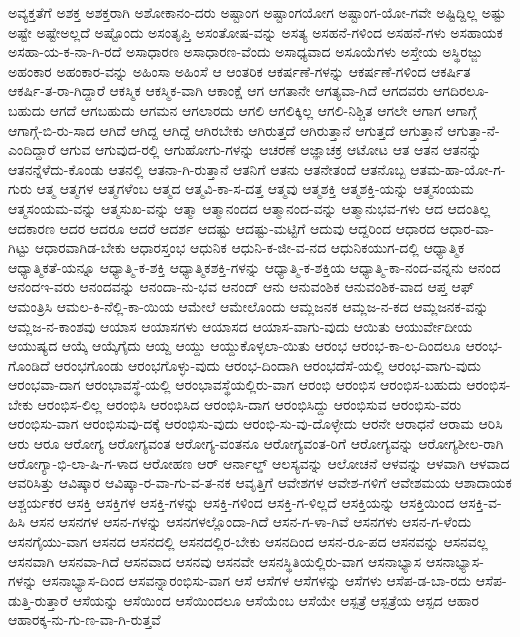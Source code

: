 {ಅವ್ಯಕ್ತತೆಗೆ
ಅಶಕ್ತ
ಅಶಕ್ತರಾಗಿ
ಅಶೋಕಾನಂ-ದರು
ಅಷ್ಟಾಂಗ
ಅಷ್ಟಾಂಗಯೋಗ
ಅಷ್ಟಾಂಗ-ಯೋ-ಗವೇ
ಅಷ್ಟಿದ್ದಿಲ್ಲ
ಅಷ್ಟು
ಅಷ್ಟೇ
ಅಷ್ಟೇಅಲ್ಲದೆ
ಅಷ್ಟೊಂದು
ಅಸಂತೃಪ್ತಿ
ಅಸಂತೋಷ-ವನ್ನು
ಅಸತ್ಯ
ಅಸಹನೆ-ಗಳಿಂದ
ಅಸಹನೆ-ಗಳು
ಅಸಹಾಯಕ
ಅಸಹಾ-ಯ-ಕ-ನಾ-ಗಿ-ರದೆ
ಅಸಾಧಾರಣ
ಅಸಾಧಾರಣ-ವೆಂದು
ಅಸಾಧ್ಯವಾದ
ಅಸೂಯೆಗಳು
ಅಸ್ತೇಯ
ಅಸ್ಥಿರಜ್ಜು
ಅಹಂಕಾರ
ಅಹಂಕಾರ-ವನ್ನು
ಅಹಿಂಸಾ
ಅಹಿಂಸೆ
ಆ
ಆಂತರಿಕ
ಆಕರ್ಷಣೆ-ಗಳನ್ನು
ಆಕರ್ಷಣೆ-ಗಳಿಂದ
ಆಕರ್ಷಿತ
ಆಕರ್ಷಿ-ತ-ರಾ-ಗಿದ್ದಾರೆ
ಆಕಸ್ಮಿಕ
ಆಕಸ್ಮಿಕ-ವಾಗಿ
ಆಕಾಂಕ್ಷೆ
ಆಗ
ಆಗತಾನೇ
ಆಗತ್ಯವಾ-ಗಿದೆ
ಆಗದವರು
ಆಗದಿರಲೂ-ಬಹುದು
ಆಗದೆ
ಆಗಬಹುದು
ಆಗಮನ
ಆಗಲಾರದು
ಆಗಲಿ
ಆಗಲಿಕ್ಕಿಲ್ಲ
ಆಗಲಿ-ನಿಶ್ಚಿತ
ಆಗಲೇ
ಆಗಾಗ
ಆಗಾಗ್ಗೆ
ಆಗಾಗ್ಗೆ-ಬಿ-ರು-ಸಾದ
ಆಗಿದೆ
ಆಗಿದ್ದ
ಆಗಿದ್ದೆ
ಆಗಿರಬೇಕು
ಆಗಿರುತ್ತದೆ
ಆಗಿರುತ್ತಾನೆ
ಆಗುತ್ತದೆ
ಆಗುತ್ತಾನೆ
ಆಗುತ್ತಾ-ನೆ-ಎಂದಿದ್ದಾರೆ
ಆಗುವ
ಆಗುವುದ-ರಲ್ಲಿ
ಆಗುಹೋಗು-ಗಳನ್ನು
ಆಚರಣೆ
ಆಜ್ಞಾಚಕ್ರ
ಆಟೋಟ
ಆತ
ಆತನ
ಆತನನ್ನು
ಆತನನ್ನೆಳೆದು-ಕೊಂಡು
ಆತನಲ್ಲಿ
ಆತನಾ-ಗಿ-ರುತ್ತಾನೆ
ಆತನಿಗೆ
ಆತನು
ಆತನೇತಂದೆ
ಆತನೊಬ್ಬ
ಆತಮ-ಹಾ-ಯೋ-ಗ-ಗುರು
ಆತ್ಮ
ಆತ್ಮಗಳ
ಆತ್ಮಗಳೆಂಬ
ಆತ್ಮದ
ಆತ್ಮವಿ-ಕಾ-ಸ-ದತ್ತ
ಆತ್ಮವು
ಆತ್ಮಶಕ್ತಿ
ಆತ್ಮಶಕ್ತಿ-ಯನ್ನು
ಆತ್ಮಸಂಯಮ
ಆತ್ಮಸಂಯಮ-ವನ್ನು
ಆತ್ಮಸುಖ-ವನ್ನು
ಆತ್ಮಾ
ಆತ್ಮಾನಂದದ
ಆತ್ಮಾನಂದ-ವನ್ನು
ಆತ್ಮಾನುಭವ-ಗಳು
ಆದ
ಆದಂತಿಲ್ಲ
ಆದಕಾರಣ
ಆದರ
ಆದರೂ
ಆದರೆ
ಆದರ್ಶ
ಆದಷ್ಟು
ಆದಷ್ಟು-ಮಟ್ಟಿಗೆ
ಆದುವು
ಆದ್ದರಿಂದ
ಆಧಾರದ
ಆಧಾರ-ವಾ-ಗಿಟ್ಟು
ಆಧಾರವಾಗಿಡ-ಬೇಕು
ಆಧಾರಸ್ತಂಭ
ಆಧುನಿಕ
ಆಧುನಿ-ಕ-ಜೀ-ವ-ನದ
ಆಧುನಿಕಯುಗ-ದಲ್ಲಿ
ಆಧ್ಯಾತ್ಮಿಕ
ಆಧ್ಯಾತ್ಮಿಕತೆ-ಯನ್ನೂ
ಆಧ್ಯಾತ್ಮಿ-ಕ-ಶಕ್ತಿ
ಆಧ್ಯಾತ್ಮಿಕಶಕ್ತಿ-ಗಳನ್ನು
ಆಧ್ಯಾತ್ಮಿ-ಕ-ಶಕ್ತಿಯ
ಆಧ್ಯಾತ್ಮಿ-ಕಾ-ನಂದ-ವನ್ನನು
ಆನಂದ
ಆನಂದಇ-ವರು
ಆನಂದವನ್ನು
ಆನಂದಾ-ನು-ಭವ
ಆನಂದ್
ಆನು
ಆನುವಂಶಿಕ
ಆನುವಂಶಿಕ-ವಾದ
ಆಪ್ತ
ಆಫ್
ಆಮಂತ್ರಿಸಿ
ಆಮಲ-ಕಿ-ನೆಲ್ಲಿ-ಕಾ-ಯಿಯ
ಆಮೇಲೆ
ಆಮೇಲೊಂದು
ಆಮ್ಲಜನಕ
ಆಮ್ಲಜ-ನ-ಕದ
ಆಮ್ಲಜನಕ-ವನ್ನು
ಆಮ್ಲಜ-ನ-ಕಾಂಶವು
ಆಯಾಸ
ಆಯಾಸಗಳು
ಆಯಾಸದ
ಆಯಾಸ-ವಾಗು-ವುದು
ಆಯಿತು
ಆಯುರ್ವೇದೀಯ
ಆಯುಷ್ಯದ
ಆಯ್ಕೆ
ಆಯ್ಕೆಗೈದು
ಆಯ್ದ
ಆಯ್ದು
ಆಯ್ದುಕೊಳ್ಳಲಾ-ಯಿತು
ಆರಂಭ
ಆರಂಭ-ಕಾ-ಲ-ದಿಂದಲೂ
ಆರಂಭ-ಗೊಂಡಿದೆ
ಆರಂಭಗೊಂಡು
ಆರಂಭಗೊಳ್ಳು-ವುದು
ಆರಂಭ-ದಿಂದಾಗಿ
ಆರಂಭದೆಸೆ-ಯಲ್ಲಿ
ಆರಂಭ-ವಾಗು-ವುದು
ಆರಂಭವಾ-ದಾಗ
ಆರಂಭಾವಸ್ಥೆ-ಯಲ್ಲಿ
ಆರಂಭಾವಸ್ಥೆಯಲ್ಲಿರು-ವಾಗ
ಆರಂಭಿ
ಆರಂಭಿಸ
ಆರಂಭಿಸ-ಬಹುದು
ಆರಂಭಿಸ-ಬೇಕು
ಆರಂಭಿಸ-ಲಿಲ್ಲ
ಆರಂಭಿಸಿ
ಆರಂಭಿಸಿದ
ಆರಂಭಿಸಿ-ದಾಗ
ಆರಂಭಿಸಿದ್ದು
ಆರಂಭಿಸುವ
ಆರಂಭಿಸು-ವರು
ಆರಂಭಿಸು-ವಾಗ
ಆರಂಭಿಸುವು-ದಕ್ಕೆ
ಆರಂಭಿಸು-ವುದು
ಆರಂಭಿ-ಸು-ವು-ದೊಳ್ಳೇದು
ಆರನೇ
ಆರಾಧನೆ
ಆರಾಮ
ಆರಿಸಿ
ಆರು
ಆರೂ
ಆರೋಗ್ಯ
ಆರೋಗ್ಯವಂತ
ಆರೋಗ್ಯ-ವಂತನೂ
ಆರೋಗ್ಯವಂತ-ರಿಗೆ
ಆರೋಗ್ಯವನ್ನು
ಆರೋಗ್ಯಶೀಲ-ರಾಗಿ
ಆರೋಗ್ಯಾ-ಭಿ-ಲಾ-ಷಿ-ಗ-ಳಾದ
ಆರೋಹಣ
ಆರ್
ಆರ್ನಾಲ್ಡ್
ಆಲಸ್ಯವನ್ನು
ಆಲೋಚನೆ
ಆಳವನ್ನು
ಆಳವಾಗಿ
ಆಳವಾದ
ಆವರಿಸಿತ್ತು
ಆವಿಷ್ಕಾರ
ಆವಿಷ್ಕಾ-ರ-ವಾ-ಗು-ವ-ತ-ನಕ
ಆವೃತ್ತಿಗೆ
ಆವೇಶಗಳ
ಆವೇಶ-ಗಳಿಗೆ
ಆವೇಶಮಯ
ಆಶಾದಾಯಕ
ಆಶ್ಚರ್ಯಕರ
ಆಸಕ್ತಿ
ಆಸಕ್ತಿಗಳ
ಆಸಕ್ತಿ-ಗಳನ್ನು
ಆಸಕ್ತಿ-ಗಳಿಂದ
ಆಸಕ್ತಿ-ಗ-ಳಿಲ್ಲದೆ
ಆಸಕ್ತಿಯನ್ನು
ಆಸಕ್ತಿಯಿಂದ
ಆಸಕ್ತಿ-ವ-ಹಿಸಿ
ಆಸನ
ಆಸನಗಳ
ಆಸನ-ಗಳನ್ನು
ಆಸನಗಳಲ್ಲೊಂದಾ-ಗಿದೆ
ಆಸನ-ಗ-ಳಾ-ಗಿವೆ
ಆಸನಗಳು
ಆಸನ-ಗ-ಳೆಂದು
ಆಸನಗೈಯು-ವಾಗ
ಆಸನದ
ಆಸನದಲ್ಲಿ
ಆಸನದಲ್ಲಿರ-ಬೇಕು
ಆಸನದಿಂದ
ಆಸನ-ರೂ-ಪದ
ಆಸನವನ್ನು
ಆಸನವಲ್ಲ
ಆಸನವಾಗಿ
ಆಸನವಾ-ಗಿದೆ
ಆಸನವಾದ
ಆಸನವು
ಆಸನವೇ
ಆಸನಸ್ಥಿತಿಯಲ್ಲಿರು-ವಾಗ
ಆಸನಾಭ್ಯಾಸ
ಆಸನಾಭ್ಯಾಸ-ಗಳನ್ನು
ಆಸನಾಭ್ಯಾಸ-ದಿಂದ
ಆಸವನ್ನಾರಂಭಿಸು-ವಾಗ
ಆಸೆ
ಆಸೆಗಳ
ಆಸೆಗಳನ್ನು
ಆಸೆಗಳು
ಆಸೆಪ-ಡ-ಬಾ-ರದು
ಆಸೆಪ-ಡುತ್ತಿ-ರುತ್ತಾರೆ
ಆಸೆಯನ್ನು
ಆಸೆಯಿಂದ
ಆಸೆಯಿಂದಲೂ
ಆಸೆಯೆಂಬ
ಆಸೆಯೇ
ಆಸ್ಪತ್ರೆ
ಆಸ್ಪತ್ರೆಯ
ಆಸ್ಪದ
ಆಹಾರ
ಆಹಾರಕ್ಕ-ನು-ಗು-ಣ-ವಾ-ಗಿ-ರುತ್ತವೆ
}
